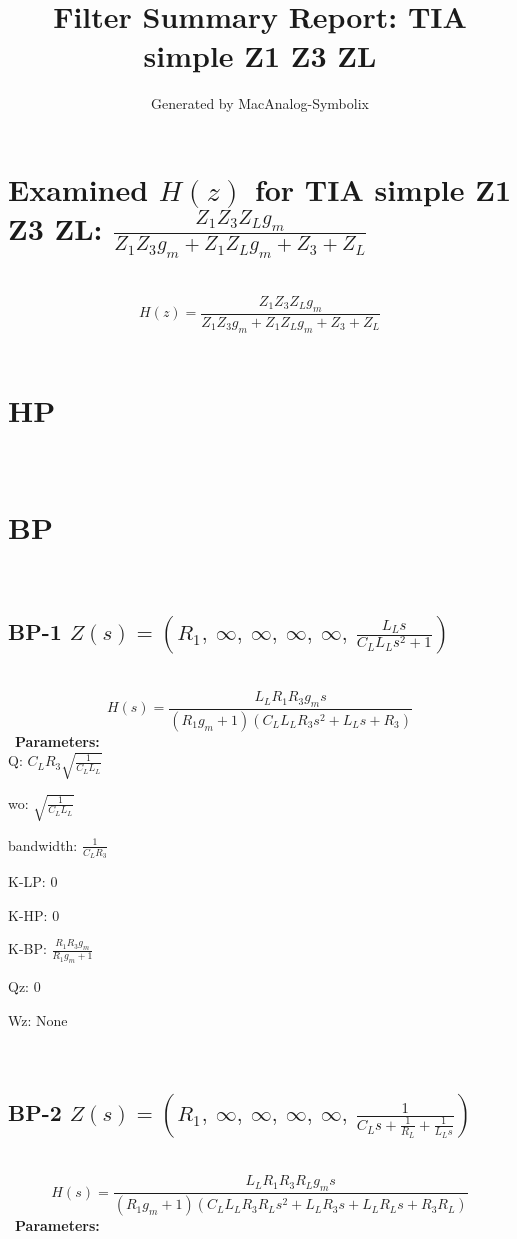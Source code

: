 \documentclass{article}
\begin{document}
        
                        \title{Filter Summary Report: TIA simple Z1 Z3 ZL}
                        \author{Generated by MacAnalog-Symbolix}
                        \maketitle

                        \tableofcontents
                        \newpage
                        \section{Examined $H(z)$ for TIA simple Z1 Z3 ZL: $\frac{Z_{1} Z_{3} Z_{L} g_{m}}{Z_{1} Z_{3} g_{m} + Z_{1} Z_{L} g_{m} + Z_{3} + Z_{L}}$ }\ 
\textbf{\[H(z) = \frac{Z_{1} Z_{3} Z_{L} g_{m}}{Z_{1} Z_{3} g_{m} + Z_{1} Z_{L} g_{m} + Z_{3} + Z_{L}}\] }\ 
\section{HP}\ 
\section{BP}\ 
\subsection{BP-1 $Z(s) = \left( R_{1}, \  \infty, \  \infty, \  \infty, \  \infty, \  \frac{L_{L} s}{C_{L} L_{L} s^{2} + 1}\right)$ } \ 
\textbf{\[H(s) = \frac{L_{L} R_{1} R_{3} g_{m} s}{\left(R_{1} g_{m} + 1\right) \left(C_{L} L_{L} R_{3} s^{2} + L_{L} s + R_{3}\right)}\] } \ 
\textbf{Parameters:}\\ 

Q: $C_{L} R_{3} \sqrt{\frac{1}{C_{L} L_{L}}}$\ 

wo: $\sqrt{\frac{1}{C_{L} L_{L}}}$\ 

bandwidth: $\frac{1}{C_{L} R_{3}}$\ 

K-LP: $0$\ 

K-HP: $0$\ 

K-BP: $\frac{R_{1} R_{3} g_{m}}{R_{1} g_{m} + 1}$\ 

Qz: $0$\ 

Wz: $\text{None}$\ 

\ 

\subsection{BP-2 $Z(s) = \left( R_{1}, \  \infty, \  \infty, \  \infty, \  \infty, \  \frac{1}{C_{L} s + \frac{1}{R_{L}} + \frac{1}{L_{L} s}}\right)$ } \ 
\textbf{\[H(s) = \frac{L_{L} R_{1} R_{3} R_{L} g_{m} s}{\left(R_{1} g_{m} + 1\right) \left(C_{L} L_{L} R_{3} R_{L} s^{2} + L_{L} R_{3} s + L_{L} R_{L} s + R_{3} R_{L}\right)}\] } \ 
\textbf{Parameters:}\\ 
\end{document}
